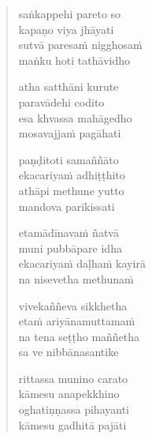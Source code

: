 \clearpage
\begin{verse}

saṅkappehi pareto so\\
kapaṇo viya jhāyati\\
sutvā paresaṁ nigghosaṁ\\
maṅku hoti tathāvidho

atha satthāni kurute\\
paravādehi codito\\
esa khvassa mahāgedho\\
mosavajjaṁ pagāhati

paṇḍitoti samaññāto\\
ekacariyaṁ adhiṭṭhito\\
athāpi methune yutto\\
mandova parikissati

etamādīnavaṁ ñatvā\\
muni pubbāpare idha\\
ekacariyaṁ daḷhaṁ kayirā\\
na nisevetha methunaṁ

vivekaññeva sikkhetha\\
etaṁ ariyānamuttamaṁ\\
na tena seṭṭho maññetha\\
sa ve nibbānasantike

rittassa munino carato\\
kāmesu anapekkhino\\
oghatiṇṇassa pihayanti\\
kāmesu gadhitā pajāti


\end{verse}


